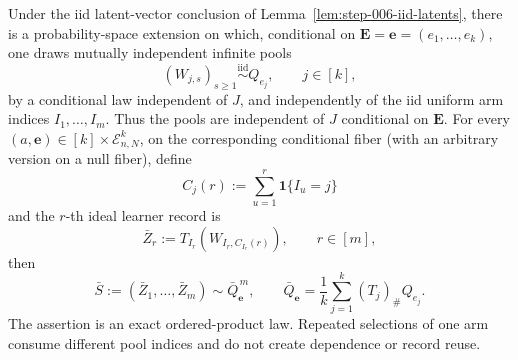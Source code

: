\begin{lemma}
\label{lem:step-007-pool-iid}

Under the iid latent-vector conclusion of
Lemma~\ref{lem:step-006-iid-latents}, there is a probability-space
extension on which, conditional on
\(\mathbf E=\mathbf e=(e_1,\ldots,e_k)\), one draws mutually
independent infinite pools
\[
(W_{j,s})_{s\ge1}\stackrel{\mathrm{iid}}{\sim}Q_{e_j},
\qquad j\in[k],
\tag{1}\label{eq:step-007-1}
\]
by a conditional law independent of \(J\), and independently of the
iid uniform arm indices \(I_1,\ldots,I_m\).  Thus the pools are
independent of \(J\) conditional on \(\mathbf E\).  For every
\((a,\mathbf e)\in[k]\times\mathcal E_{n,N}^k\), on the corresponding
conditional fiber (with an arbitrary version on a null fiber), define
\[
C_j(r):=\sum_{u=1}^r\mathbf1\{I_u=j\}
\tag{2}\label{eq:step-007-2}
\]
and the \(r\)-th ideal learner record is
\[
\bar Z_r
:=
T_{I_r}\!\left(W_{I_r,C_{I_r}(r)}\right),
\qquad r\in[m],
\tag{3}\label{eq:step-007-3}
\]
then
\[
\bar S:=(\bar Z_1,\ldots,\bar Z_m)
\sim \bar Q_{\mathbf e}^{\,m},
\qquad
\bar Q_{\mathbf e}
=\frac1k\sum_{j=1}^k (T_j)_\#Q_{e_j}.
\tag{4}\label{eq:step-007-4}
\]
The assertion is an exact ordered-product law.  Repeated selections of
one arm consume different pool indices and do not create dependence or
record reuse.

\end{lemma}

